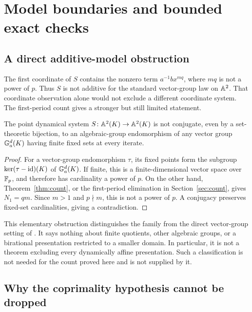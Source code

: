 \section{Model boundaries and bounded exact checks}\label{sec:boundaries}

\subsection{A direct additive-model obstruction}

The first coordinate of $S$ contains the nonzero term
$a^{-1}b x^{mq}$, where $mq$ is not a power of $p$.
Thus $S$ is not additive for the standard vector-group law on $\mathbb A^2$.
That coordinate observation alone would not exclude a different
coordinate system. The first-period count gives a stronger but still
limited statement.

\begin{proposition}\label{prop:no-vector}
The point dynamical system $S\colon\mathbb A^2(K)\to\mathbb A^2(K)$ is not conjugate,
even by a set-theoretic bijection, to an algebraic-group endomorphism
of any vector group $\mathbb G_a^d(K)$ having finite fixed sets at every iterate.
\end{proposition}

\begin{proof}
For a vector-group endomorphism $\tau$, its fixed points form the
subgroup $\ker(\tau-\operatorname{id})(K)$ of $\mathbb G_a^d(K)$. If finite, this is a
finite-dimensional vector space over $\mathbb F_p$, and therefore has
cardinality a power of $p$. On the other hand,
Theorem~\ref{thm:count}, or the first-period elimination in
Section~\ref{sec:count}, gives $N_1=qm$. Since $m>1$ and $p\nmid m$,
this is not a power of $p$. A conjugacy preserves fixed-set
cardinalities, giving a contradiction.
\end{proof}

This elementary obstruction distinguishes the family from the direct
vector-group setting of \cite[Theorem 5.2.5]{bch2024groups}.
It says nothing about finite quotients, other algebraic groups, or a
birational presentation restricted to a smaller domain. In particular,
it is not a theorem excluding every dynamically affine presentation.
Such a classification is not needed for the count proved here and is
not supplied by it.

\subsection{Why the coprimality hypothesis cannot be dropped}

